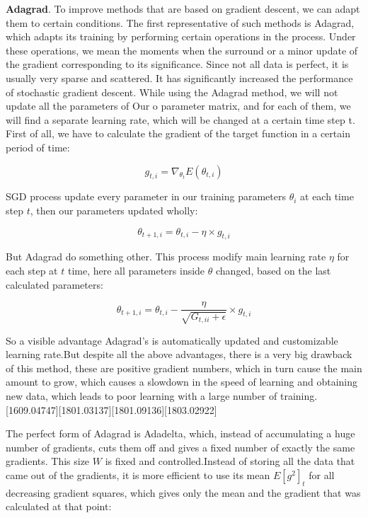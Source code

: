 \par \textbf{Adagrad}. To improve methods that are based on gradient descent, we can adapt them to certain conditions. The first representative of such methods is Adagrad, which adapts its training by performing certain operations in the process. Under these operations, we mean the moments when the surround or a minor update of the gradient corresponding to its significance. Since not all data is perfect, it is usually very sparse and scattered. It has significantly increased the performance of stochastic gradient descent. While using the Adagrad method, we will not update all the parameters of Our o parameter matrix, and for each of them, we will find a separate learning rate, which will be changed at a certain time step t. First of all, we have to calculate the gradient of the target function in a certain period of time:

\begin{equation}
g_{t,i} = \nabla_{\theta_t} E(\theta_{t,i})
\end{equation}

\par SGD process update every parameter in our training parameters $\theta_i$ at each time step $t$, then our parameters updated wholly:

\begin{equation}
\theta_{t+1,i} = \theta_{t,i} - \eta \times g_{t,i}
\end{equation}

\par But Adagrad do something other. This process modify main learning rate $\eta$ for each step at $t$ time, here all parameters inside $\theta$ changed, based on the last calculated parameters:

\begin{equation}
\theta_{t+1, i} = \theta_{t,i} - \dfrac{\eta}{\sqrt{G_{t,ii}+\epsilon}}\times g_{t,i}
\end{equation}

\par So a visible advantage Adagrad's is automatically updated and customizable learning rate.But despite all the above advantages, there is a very big drawback of this method, these are positive gradient numbers, which in turn cause the main amount to grow, which causes a slowdown in the speed of learning and obtaining new data, which leads to poor learning with a large number of training.[1609.04747][1801.03137][1801.09136][1803.02922]

\par The perfect form of Adagrad is Adadelta, which, instead of accumulating a huge number of gradients, cuts them off and gives a fixed number of exactly the same gradients. This size $W$ is fixed and controlled.Instead of storing all the data that came out of the gradients, it is more efficient to use its mean $E[g^2]_t$ for all decreasing gradient squares, which gives only the mean and the gradient that was calculated at that point:


